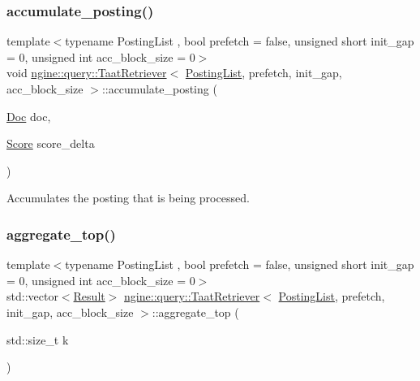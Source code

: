 \subsubsection{\texorpdfstring{accumulate\+\_\+posting()}{accumulate\_posting()}}
{\footnotesize\ttfamily template$<$typename Posting\+List , bool prefetch = false, unsigned short init\+\_\+gap = 0, unsigned int acc\+\_\+block\+\_\+size = 0$>$ \\
void \hyperlink{classngine_1_1query_1_1TaatRetriever}{ngine\+::query\+::\+Taat\+Retriever}$<$ \hyperlink{classngine_1_1PostingList}{Posting\+List}, prefetch, init\+\_\+gap, acc\+\_\+block\+\_\+size $>$\+::accumulate\+\_\+posting (\begin{DoxyParamCaption}\item[{\hyperlink{structngine_1_1Doc}{Doc}}]{doc,  }\item[{\hyperlink{structngine_1_1Score}{Score}}]{score\+\_\+delta }\end{DoxyParamCaption})\hspace{0.3cm}{\ttfamily [inline]}}



Accumulates the posting that is being processed. 

\mbox{\label{classngine_1_1query_1_1TaatRetriever_a5b79dd87bef881e991d73f8cb42247b1}} 
\subsubsection{\texorpdfstring{aggregate\+\_\+top()}{aggregate\_top()}}
{\footnotesize\ttfamily template$<$typename Posting\+List , bool prefetch = false, unsigned short init\+\_\+gap = 0, unsigned int acc\+\_\+block\+\_\+size = 0$>$ \\
std\+::vector$<$\hyperlink{structngine_1_1query_1_1Result}{Result}$>$ \hyperlink{classngine_1_1query_1_1TaatRetriever}{ngine\+::query\+::\+Taat\+Retriever}$<$ \hyperlink{classngine_1_1PostingList}{Posting\+List}, prefetch, init\+\_\+gap, acc\+\_\+block\+\_\+size $>$\+::aggregate\+\_\+top (\begin{DoxyParamCaption}\item[{std\+::size\+\_\+t}]{k }\end{DoxyParamCaption})\hspace{0.3cm}{\ttfamily [inline]}}

